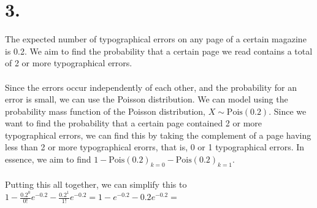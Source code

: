 \documentclass{article}
\begin{document}
\section*{3.}
{\Large 

The expected number of typographical errors on any page of a certain magazine is 0.2. We aim to find the probability that a certain page we read contains a total of 2 or more typographical errors. \\ \\ 
Since the errors occur independently of each other, and the probability for an error is small, we can use the Poisson distribution. We can model using the probability mass function of the Poisson distribution, $X \sim \text{Pois}(0.2)$. Since we want to find the probability that a certain page contained 2 or more typographical errors, we can find this by taking the complement of a page having less than 2 or more typographical erorrs, that is, 0 or 1 typographical errors. In essence, we aim to find $1 - \text{Pois}(0.2)_{k = 0} - \text{Pois}(0.2)_{k = 1}$. \\ \\ 
Putting this all together, we can simplify this to $1 - \frac{0.2^{0}}{0!}e^{-0.2} - \frac{0.2^1}{1!}e^{-0.2} = 1 - e^{-0.2} - 0.2e^{-0.2} = $ 

}
\end{document}
